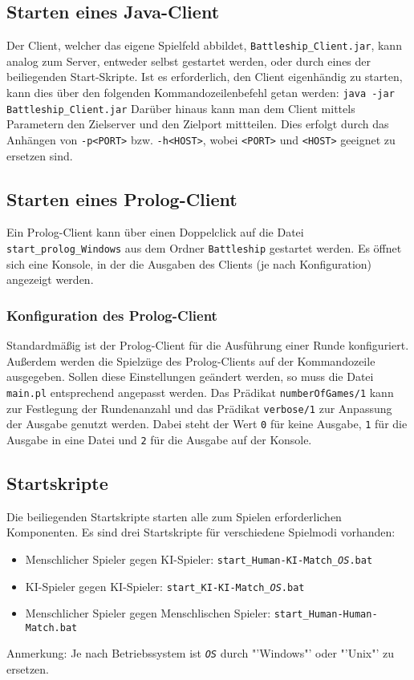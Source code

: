 \subsection{Starten eines Java-Client}
	Der Client, welcher das eigene Spielfeld abbildet, \texttt{Battleship\_Client.jar}, kann analog zum Server, entweder selbst gestartet werden, oder 
	durch eines der beiliegenden Start-Skripte.
	Ist es erforderlich, den Client eigenhändig zu starten, kann dies über den folgenden Kommandozeilenbefehl getan werden:\newline
	\texttt{java -jar Battleship\_Client.jar}\newline
	Darüber hinaus kann man dem Client mittels Parametern den Zielserver und den Zielport mittteilen.
	Dies erfolgt durch das Anhängen von \texttt{-p<PORT>} bzw. \texttt{-h<HOST>}, wobei \texttt{<PORT>} und \texttt{<HOST>} geeignet zu ersetzen sind. 

\subsection{Starten eines Prolog-Client}
	Ein Prolog-Client kann über einen Doppelclick auf die Datei \texttt{start\_prolog\_Windows} aus dem Ordner 
	\texttt{Battleship} 
	gestartet werden. Es öffnet sich eine Konsole, in der die Ausgaben des Clients (je nach Konfiguration) angezeigt werden.
	
	\subsubsection {Konfiguration des Prolog-Client}
		Standardmäßig ist der Prolog-Client für die Ausführung einer Runde konfiguriert. Außerdem werden die Spielzüge des Prolog-Clients auf
		der Kommandozeile ausgegeben. Sollen diese Einstellungen geändert werden, so muss die Datei \texttt{main.pl} entsprechend angepasst werden.
		Das Prädikat \texttt{numberOfGames/1} kann zur Festlegung der Rundenanzahl und das Prädikat \texttt{verbose/1} zur Anpassung der Ausgabe 
		genutzt werden. Dabei steht der Wert \texttt{0} für keine Ausgabe, \texttt{1} für die Ausgabe in eine Datei und \texttt{2} für 
		die Ausgabe auf der Konsole.
\subsection{Startskripte} %
\label{sub:startskripte}
	Die beiliegenden Startskripte starten alle zum Spielen erforderlichen Komponenten. Es sind drei Startskripte für verschiedene Spielmodi vorhanden:
	\begin{itemize}
		\item Menschlicher Spieler gegen KI-Spieler: \texttt{start\_Human-KI-Match\_\emph{OS}.bat}
		\item KI-Spieler gegen KI-Spieler: \texttt{start\_KI-KI-Match\_\emph{OS}.bat}
		\item Menschlicher Spieler gegen Menschlischen Spieler: \texttt{start\_Human-Human-Match.bat}
	\end{itemize}
	Anmerkung: Je nach Betriebssystem ist \texttt{\emph{OS}} durch "'Windows"' oder "'Unix"' zu ersetzen.
	
